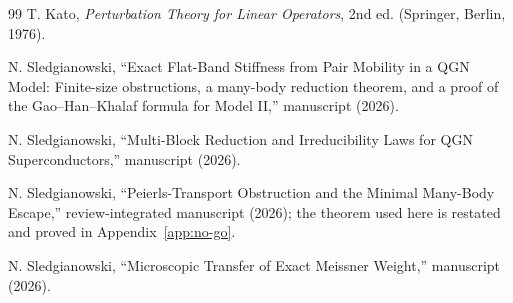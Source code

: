 \documentclass[11pt]{article}
\theoremstyle{definition}
\theoremstyle{remark}
\begin{document}
\begin{thebibliography}{99}
T. Kato,
\emph{Perturbation Theory for Linear Operators}, 2nd ed.
(Springer, Berlin, 1976).

N. Sledgianowski,
``Exact Flat-Band Stiffness from Pair Mobility in a QGN Model: Finite-size obstructions, a many-body reduction theorem, and a proof of the Gao--Han--Khalaf formula for Model II,'' manuscript (2026).

N. Sledgianowski,
``Multi-Block Reduction and Irreducibility Laws for QGN Superconductors,'' manuscript (2026).

N. Sledgianowski,
``Peierls-Transport Obstruction and the Minimal Many-Body Escape,'' review-integrated manuscript (2026); the theorem used here is restated and proved in Appendix~\ref{app:no-go}.

N. Sledgianowski,
``Microscopic Transfer of Exact Meissner Weight,'' manuscript (2026).

\end{thebibliography}
\end{document}
